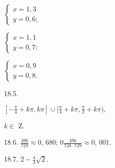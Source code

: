 \documentclass[a4paper,12pt]{article}
\begin{document}
$\left\{\begin{array}{l}
x=1,3\\
y=0,6;
\end{array}\right.$

$\left\{\begin{array}{l}
x=1,1\\
y=0,7;
\end{array}\right.$

$\left\{\begin{array}{l}
x=0,9\\
y=0,8.
\end{array}\right.$

18.5.

$[-\displaystyle \frac{\pi}{4}+k\pi,k\pi]\cup[\frac{\pi}{4}+k\pi,\frac{\pi}{2}+k\pi),$

$ k\in$ Z.

18.6. $\displaystyle \frac{496}{729}\approx 0$, 680; $0 \displaystyle \frac{496}{728\cdot 729}\approx 0$, 001.

18.7. $2-\displaystyle \frac{4}{3}\sqrt{2}.$
\end{document}
